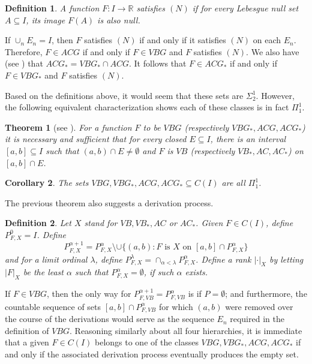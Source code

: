 \documentclass[12pt]{amsart}
\newtheorem{theorem}{Theorem}
\newtheorem{cor}[theorem]{Corollary}
\newtheorem{definition}{Definition}
\begin{document}
\begin{definition}
A function $F:I\rightarrow \mathbb R$ satisfies $(N)$ if for every Lebesgue 
null set $A\subseteq I$, its image $F(A)$ is also null.
\end{definition}

If $\cup_n E_n = I$, then $F$ satisfies $(N)$ if and only if it 
satisfies $(N)$ on each $E_n$.  Therefore, $F \in ACG$ if and only if 
$F \in VBG$ and $F$ satisfies $(N)$.  We also have (see \cite[Thm VII.8.8, 
pg. 233]{saks}) that $ACG_\ast = VBG_\ast \cap ACG$.  It follows that 
$F \in ACG_\ast$ if and only if $F \in VBG_\ast$ and $F$ satisfies $(N)$.

Based on the definitions above, it would seem that these sets are 
$\Sigma^1_2$.  However, the following equivalent characterization
shows each of these classes is in fact $\Pi^1_1$.

\begin{theorem}[see {\cite[Thm VII.9.1, pg 233]{saks}}]\label{thm:7}
For a function $F$ to be $VBG$ (respectively $VBG_\ast,ACG, ACG_\ast$) 
it is necessary and sufficient that for every closed $E \subseteq I$, 
there is an interval $[a,b]\subseteq I$ such that 
$(a,b) \cap E \neq \emptyset$ 
and $F$ is $VB$ 
(respectively $VB_\ast, AC, AC_\ast$) on $[a,b] \cap E$.
\end{theorem}

\begin{cor}
The sets $VBG, VBG_\ast, ACG, ACG_\ast \subseteq C(I)$ are all 
$\Pi^1_1$.
\end{cor}

The previous theorem also suggests a derivation process.
\begin{definition}
Let $X$ stand for $VB, VB_\ast, AC$ 
or $AC_\ast$.  Given $F \in C(I)$, define $P^0_{F,X} = I$. 
Define 
$$P^{\alpha + 1}_{F,X} = P^\alpha_{F,X} \setminus \cup \{(a,b) : F \text{ is 
$X$ on } [a,b]\cap P^\alpha_{F,X}\}$$
and for a limit ordinal $\lambda$, define 
$P^\lambda_{F,X} = \cap_{\alpha< \lambda} P^\alpha_{F,X}$.
Define a rank $|\cdot|_X$ by letting $|F|_X$ be the least 
$\alpha$ such that $P^\alpha_{F,X} = \emptyset$, if such $\alpha$ 
exists.
\end{definition}


If $F \in VBG$, then the only way for $P^{\alpha+1}_{F,VB} = P^\alpha_{F,VB}$ is 
if $P=\emptyset$; and furthermore, the countable 
sequence of sets $[a,b]\cap P^\alpha_{F,VB}$ for which $(a,b)$ 
were removed over the course of the derivations would serve as 
the sequence $E_n$ required in the definition of $VBG$.
Reasoning similarly about all four hierarchies,
it is immediate that a given $F \in C(I)$ belongs to one of the 
classes $VBG, VBG_\ast, ACG, ACG_\ast$ if and only if the associated 
derivation process eventually produces the empty set.  
\end{document}
